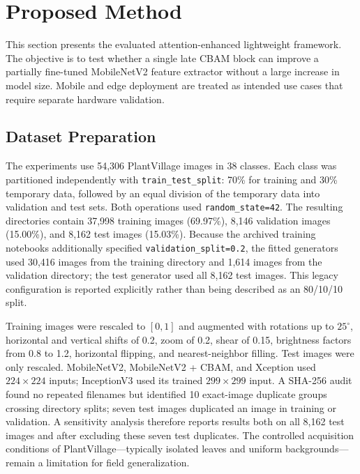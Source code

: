 \section{Proposed Method}

This section presents the evaluated attention-enhanced lightweight framework. The objective is to test whether a single late CBAM block can improve a partially fine-tuned MobileNetV2 feature extractor without a large increase in model size. Mobile and edge deployment are treated as intended use cases that require separate hardware validation.

\subsection{Dataset Preparation}

The experiments use 54,306 PlantVillage images in 38 classes. Each class was partitioned independently with \texttt{train\_test\_split}: 70\% for training and 30\% temporary data, followed by an equal division of the temporary data into validation and test sets. Both operations used \texttt{random\_state=42}. The resulting directories contain 37,998 training images (69.97\%), 8,146 validation images (15.00\%), and 8,162 test images (15.03\%). Because the archived training notebooks additionally specified \texttt{validation\_split=0.2}, the fitted generators used 30,416 images from the training directory and 1,614 images from the validation directory; the test generator used all 8,162 test images. This legacy configuration is reported explicitly rather than being described as an 80/10/10 split.

Training images were rescaled to $[0,1]$ and augmented with rotations up to $25^{\circ}$, horizontal and vertical shifts of 0.2, zoom of 0.2, shear of 0.15, brightness factors from 0.8 to 1.2, horizontal flipping, and nearest-neighbor filling. Test images were only rescaled. MobileNetV2, MobileNetV2 + CBAM, and Xception used $224 \times 224$ inputs; InceptionV3 used its trained $299 \times 299$ input. A SHA-256 audit found no repeated filenames but identified 10 exact-image duplicate groups crossing directory splits; seven test images duplicated an image in training or validation. A sensitivity analysis therefore reports results both on all 8,162 test images and after excluding these seven test duplicates. The controlled acquisition conditions of PlantVillage---typically isolated leaves and uniform backgrounds---remain a limitation for field generalization.

